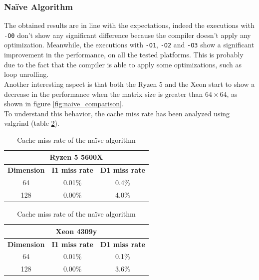 \documentclass{article}
\begin{document}
\subsubsection{Na\"{i}ve Algorithm}
The obtained results are in line with the expectations, indeed the executions with \texttt{-O0} don't show any significant difference because the compiler 
doesn't apply any optimization. Meanwhile, the executions with \texttt{-O1}, \texttt{-O2} and \texttt{-O3} show a significant improvement in the performance, on all
the tested platforms. This is probably due to the fact that the compiler is able to apply some optimizations, such as loop unrolling. \\
Another interesting aspect is that both the Ryzen 5 and the Xeon start to show a decrease in the performance when the matrix size is greater than $64 \times 64$, 
as shown in figure \ref{fig:naive_comparison}. \\
To understand this behavior, the cache miss rate has been analyzed using valgrind (table \ref{tab:naive_cache_miss}). \\ 
\begin{table}[h]
    \centering
    \begin{tabular}{|c|c|c|}
        \hline
        \multicolumn{3}{|c|}{\textbf{Ryzen 5 5600X}} \\
        \hline
        \textbf{Dimension}            & \textbf{I1 miss rate} & \textbf{D1 miss rate} \\ \hline
        64                   & 0.01\%       & 0.4\%        \\ \hline
        128                  & 0.00\%       & 4.0\%        \\ \hline 
    \end{tabular}
    \hspace{2em}
    \begin{tabular}{|c|c|c|}
        \hline
        \multicolumn{3}{|c|}{\textbf{Xeon 4309y}} \\
        \hline
        \textbf{Dimension}            & \textbf{I1 miss rate} & \textbf{D1 miss rate} \\ \hline
        64                   & 0.01\%       & 0.1\%        \\ \hline
        128                  & 0.00\%       & 3.6\%        \\ \hline 
    \end{tabular}
    \caption{Cache miss rate of the na\"{i}ve algorithm}
    \label{tab:naive_cache_miss}
\end{table}
\end{document}
